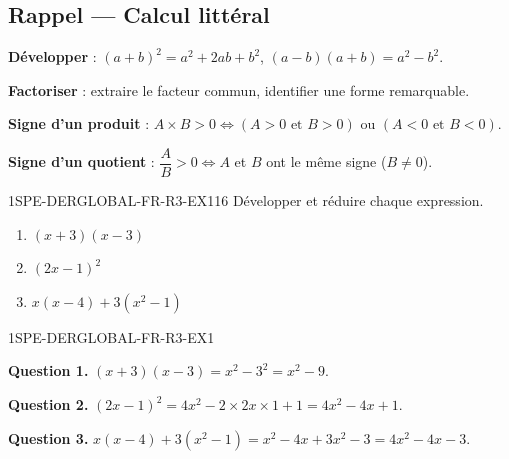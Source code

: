 

\subsection*{Rappel — Calcul littéral}

\textbf{Développer} : $(a+b)^2 = a^2 + 2ab + b^2$, $(a-b)(a+b) = a^2 - b^2$.

\textbf{Factoriser} : extraire le facteur commun, identifier une forme remarquable.

\textbf{Signe d'un produit} : $A \times B > 0 \Leftrightarrow (A>0 \text{ et } B>0)$ ou $(A<0 \text{ et } B<0)$.

\textbf{Signe d'un quotient} : $\dfrac{A}{B} > 0 \Leftrightarrow A$ et $B$ ont le même signe ($B
\neq 0$).


\begin{exercice}{1SPE-DERGLOBAL-FR-R3-EX1}{1}{6}
Développer et réduire chaque expression.
\begin{enumerate}
  \item $(x+3)(x-3)$
  \item $(2x-1)^2$
  \item $x(x-4) + 3(x^2 - 1)$
\end{enumerate}
\end{exercice}


\begin{corrige}{1SPE-DERGLOBAL-FR-R3-EX1}

\textbf{Question 1.}
$(x+3)(x-3) = x^2 - 3^2 = x^2 - 9.$


\textbf{Question 2.}
$(2x-1)^2 = 4x^2 - 2 \times 2x \times 1 + 1 = 4x^2 - 4x + 1.$

\textbf{Question 3.}
$x(x-4) + 3(x^2-1) = x^2 - 4x + 3x^2 - 3 = 4x^2 - 4x - 3.$

\end{corrige}

